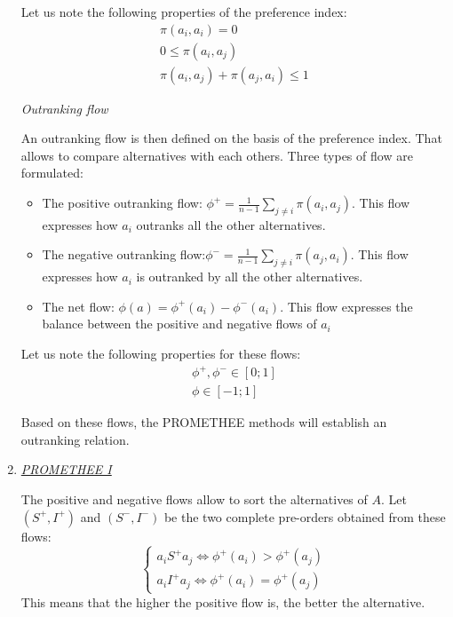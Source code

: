 \begin{enumerate}
Let us note the following properties of the preference index:
\begin{eqnarray}
&\pi(a_i,a_i) = 0&\\
&0 \leq \pi(a_i,a_j)&\\
&\pi(a_i, a_j) + \pi(a_j,a_i) \leq 1&
\end{eqnarray}

\textit{Outranking flow}

An \og outranking flow \fg is then defined on the basis of the preference index. That allows to compare alternatives with each others. Three types of flow are formulated:
\begin{itemize}
\item The positive outranking flow: $\phi^{+} = \frac{1}{n-1} \sum_{j \neq i} \pi (a_i, a_j)$. This flow expresses how $a_i$ outranks all the other alternatives.
\item The negative outranking flow:$\phi^{-} = \frac{1}{n-1} \sum_{j \neq i} \pi (a_j, a_i)$. This flow expresses how $a_i$ is outranked by all the other alternatives.
\item The net flow: $\phi(a) = \phi^{+}(a_i) - \phi^{-}(a_i)$. This flow expresses the balance between the positive and negative flows of $a_i$
\end{itemize}
Let us note the following properties for these flows:
\begin{eqnarray}
&\phi^{+}, \phi^{-} \in [0;1]&\\
&\phi \in [-1;1]&
\end{eqnarray}

Based on these flows, the PROMETHEE methods will establish an outranking relation.

\item \textit{\underline{PROMETHEE I}}

The positive and negative flows allow to sort the alternatives of $A$. Let $(S^{+}, I^{+})$ and $(S^{-}, I^{-})$ be the two complete pre-orders obtained from these flows:
\begin{equation}
\begin{cases}
a_iS^{+}a_j \Leftrightarrow \phi^{+}(a_i) > \phi^{+}(a_j)\\
a_iI^{+}a_j \Leftrightarrow \phi^{+}(a_i) = \phi^{+}(a_j)
\end{cases}
\end{equation}
This means that the higher the positive flow is, the better the alternative.


\end{enumerate}
